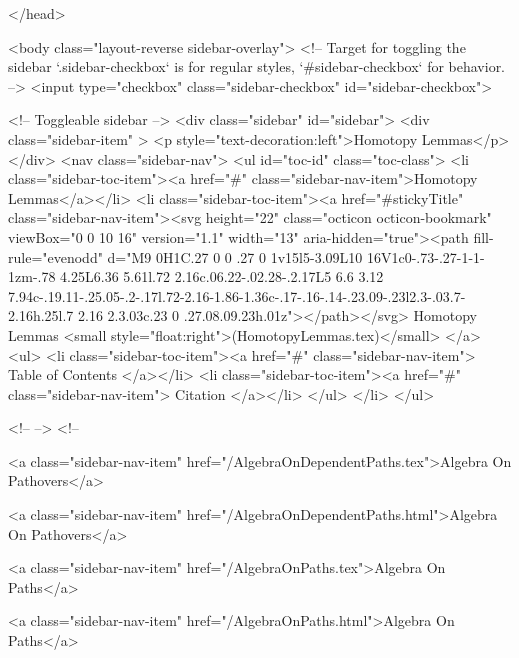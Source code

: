 </head>


  <body class="layout-reverse sidebar-overlay">
    <!-- Target for toggling the sidebar `.sidebar-checkbox` is for regular
     styles, `#sidebar-checkbox` for behavior. -->
<input type="checkbox" class="sidebar-checkbox" id="sidebar-checkbox">

<!-- Toggleable sidebar -->
<div class="sidebar" id="sidebar">
  <div class="sidebar-item" >
    <p style="text-decoration:left">Homotopy Lemmas</p>
  </div>
  <nav class="sidebar-nav">
    <ul id="toc-id" class="toc-class">
  <li class="sidebar-toc-item"><a href="#" class="sidebar-nav-item">Homotopy Lemmas</a></li>
  <li class="sidebar-toc-item"><a href="#stickyTitle" class="sidebar-nav-item"><svg height="22" class="octicon octicon-bookmark" viewBox="0 0 10 16" version="1.1" width="13" aria-hidden="true"><path fill-rule="evenodd" d="M9 0H1C.27 0 0 .27 0 1v15l5-3.09L10 16V1c0-.73-.27-1-1-1zm-.78 4.25L6.36 5.61l.72 2.16c.06.22-.02.28-.2.17L5 6.6 3.12 7.94c-.19.11-.25.05-.2-.17l.72-2.16-1.86-1.36c-.17-.16-.14-.23.09-.23l2.3-.03.7-2.16h.25l.7 2.16 2.3.03c.23 0 .27.08.09.23h.01z"></path></svg> Homotopy Lemmas <small style="float:right">(HomotopyLemmas.tex)</small>
</a>
    <ul>
      <li class="sidebar-toc-item"><a href="#" class="sidebar-nav-item"> Table of Contents </a></li>
      <li class="sidebar-toc-item"><a href="#" class="sidebar-nav-item"> Citation </a></li>
    </ul>
  </li>
</ul>


    <!--  -->
    <!-- 
      
    
      
    
      
    
      
        
      
    
      
        
          <a class="sidebar-nav-item" href="/AlgebraOnDependentPaths.tex">Algebra On Pathovers</a>
        
      
    
      
        
          <a class="sidebar-nav-item" href="/AlgebraOnDependentPaths.html">Algebra On Pathovers</a>
        
      
    
      
        
          <a class="sidebar-nav-item" href="/AlgebraOnPaths.tex">Algebra On Paths</a>
        
      
    
      
        
          <a class="sidebar-nav-item" href="/AlgebraOnPaths.html">Algebra On Paths</a>
        
